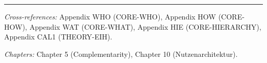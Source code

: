 \vspace{1em}
\hrule
\vspace{0.5em}

\noindent\textit{Cross-references:}
Appendix WHO (CORE-WHO),
Appendix HOW (CORE-HOW),
Appendix WAT (CORE-WHAT),
Appendix HIE (CORE-HIERARCHY),
Appendix CAL1 (THEORY-EIH).

\noindent\textit{Chapters:} Chapter 5 (Complementarity), Chapter 10 (Nutzenarchitektur).



